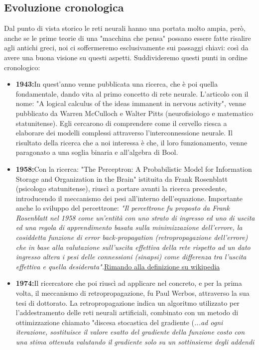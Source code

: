 \documentclass{article}
\begin{document}
\flushleft\subsection{Evoluzione cronologica}
\flushleft 
\begin{justify}
    Dal punto di vista storico le reti neurali hanno una portata molto ampia, però, anche se le prime teorie di una "macchina che pensa" possano essere fatte risalire agli antichi greci, noi ci soffermeremo esclusivamente sui passaggi chiavi: così da avere una buona visione su questi aspetti. Suddivideremo questi punti in ordine cronologico:
\begin{itemize}
    \item \textbf{1943:}In quest'anno venne pubblicata una ricerca, che è poi quella fondamentale, dando vita al primo concetto di rete neurale. L'articolo con il nome: "A logical calculus of the ideas immanent in nervous activity", venne pubblicato da Warren McCulloch e Walter Pitts (neurofisiologo e matematico statunitense). Egli cercarono di comprendere come il cervello riesca a elaborare dei modelli complessi attraverso l'interconnessione neurale. Il risultato della ricerca che a noi interessa è che, il loro funzionamento, venne paragonato a una soglia binaria e all'algebra di Bool.\citep{mcculloch1943logical}
    \item \textbf{1958:}Con la ricerca: "The Perceptron: A Probabilistic Model for Information Storage and Organization in the Brain" istituita da Frank Rosenblatt (psicologo statunitense), riuscì a portare avanti la ricerca precedente, introducendo il meccanismo dei pesi all'interno dell'equazione\citep{rosenblatt1958perceptron}.
    Importante anche lo sviluppo del percettrone: \textit{"Il percettrone fu proposto da Frank Rosenblatt nel 1958 come un'entità con uno strato di ingresso ed uno di uscita ed una regola di apprendimento basata sulla minimizzazione dell'errore, la cosiddetta funzione di error back-propagation (retropropagazione dell'errore) che in base alla valutazione sull'uscita effettiva della rete rispetto ad un dato ingresso altera i pesi delle connessioni (sinapsi) come differenza tra l'uscita effettiva e quella desiderata".}\href{https://it.wikipedia.org/wiki/Percettrone}{Rimando alla definizione su wikipedia}
    \item \textbf{1974:}Il ricercatore che poi riuscì ad applicare nel concreto, e per la prima volta, il meccanismo di retropropagazione, fu Paul Werbos, attraverso la sua tesi di dottorato. La retropropagazione indica un algoritmo utilizzato per l'addestramento delle reti neurali artificiali, combinato con un metodo di ottimizzazione chiamato "discesa stocastica del gradiente (\textit{...ad ogni iterazione, sostituisce il valore esatto del gradiente della funzione costo con una stima ottenuta valutando il gradiente solo su un sottinsieme degli addendi}\citep{werbos1990backpropagation}

\end{itemize}
\end{justify}
\end{document}
